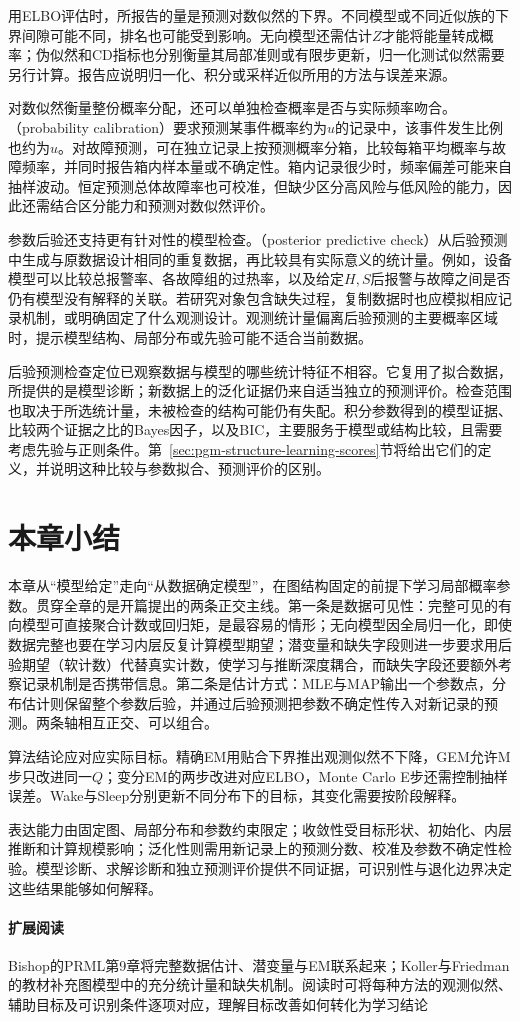 用ELBO评估时，所报告的量是预测对数似然的下界。不同模型或不同近似族的下界间隙可能不同，排名也可能受到影响。无向模型还需估计$Z$才能将能量转成概率；伪似然和CD指标也分别衡量其局部准则或有限步更新，归一化测试似然需要另行计算。报告应说明归一化、积分或采样近似所用的方法与误差来源。

对数似然衡量整份概率分配，还可以单独检查概率是否与实际频率吻合。（probability calibration）要求预测某事件概率约为$u$的记录中，该事件发生比例也约为$u$。对故障预测，可在独立记录上按预测概率分箱，比较每箱平均概率与故障频率，并同时报告箱内样本量或不确定性。箱内记录很少时，频率偏差可能来自抽样波动。恒定预测总体故障率也可校准，但缺少区分高风险与低风险的能力，因此还需结合区分能力和预测对数似然评价。

参数后验还支持更有针对性的模型检查。（posterior predictive check）从后验预测中生成与原数据设计相同的重复数据，再比较具有实际意义的统计量。例如，设备模型可以比较总报警率、各故障组的过热率，以及给定$H,S$后报警与故障之间是否仍有模型没有解释的关联。若研究对象包含缺失过程，复制数据时也应模拟相应记录机制，或明确固定了什么观测设计。观测统计量偏离后验预测的主要概率区域时，提示模型结构、局部分布或先验可能不适合当前数据。

后验预测检查定位已观察数据与模型的哪些统计特征不相容。它复用了拟合数据，所提供的是模型诊断；新数据上的泛化证据仍来自适当独立的预测评价。检查范围也取决于所选统计量，未被检查的结构可能仍有失配。积分参数得到的模型证据、比较两个证据之比的Bayes因子，以及BIC，主要服务于模型或结构比较，且需要考虑先验与正则条件。第~\ref{sec:pgm-structure-learning-scores}节将给出它们的定义，并说明这种比较与参数拟合、预测评价的区别。

\section{本章小结}
\label{sec:pgm-parameter-learning-summary}

本章从“模型给定”走向“从数据确定模型”，在图结构固定的前提下学习局部概率参数。贯穿全章的是开篇提出的两条正交主线。第一条是数据可见性：完整可见的有向模型可直接聚合计数或回归矩，是最容易的情形；无向模型因全局归一化，即使数据完整也要在学习内层反复计算模型期望；潜变量和缺失字段则进一步要求用后验期望（软计数）代替真实计数，使学习与推断深度耦合，而缺失字段还要额外考察记录机制是否携带信息。第二条是估计方式：MLE与MAP输出一个参数点，分布估计则保留整个参数后验，并通过后验预测把参数不确定性传入对新记录的预测。两条轴相互正交、可以组合。

算法结论应对应实际目标。精确EM用贴合下界推出观测似然不下降，GEM允许M步只改进同一$Q$；变分EM的两步改进对应ELBO，Monte Carlo E步还需控制抽样误差。Wake与Sleep分别更新不同分布下的目标，其变化需要按阶段解释。

表达能力由固定图、局部分布和参数约束限定；收敛性受目标形状、初始化、内层推断和计算规模影响；泛化性则需用新记录上的预测分数、校准及参数不确定性检验。模型诊断、求解诊断和独立预测评价提供不同证据，可识别性与退化边界决定这些结果能够如何解释。

\paragraph{扩展阅读}
Bishop的PRML第9章将完整数据估计、潜变量与EM联系起来；Koller与Friedman的教材补充图模型中的充分统计量和缺失机制。阅读时可将每种方法的观测似然、辅助目标及可识别条件逐项对应，理解目标改善如何转化为学习结论
